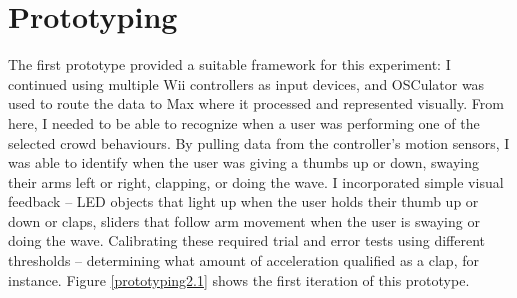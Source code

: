 

\section{Prototyping}

The first prototype provided a suitable framework for this experiment: I continued using multiple Wii controllers as input devices, and OSCulator was used to route the data to Max where it processed and represented visually. From here, I needed to be able to recognize when a user was performing one of the selected crowd behaviours. By pulling data from the controller's motion sensors, I was able to identify when the user was giving a thumbs up or down, swaying their arms left or right, clapping, or doing the wave. I incorporated simple visual feedback -- LED objects that light up when the user holds their thumb up or down or claps, sliders that follow arm movement when the user is swaying or doing the wave. Calibrating these required trial and error tests using different thresholds -- determining what amount of acceleration qualified as a clap, for instance. Figure \ref{prototyping2.1} shows the first iteration of this prototype.

